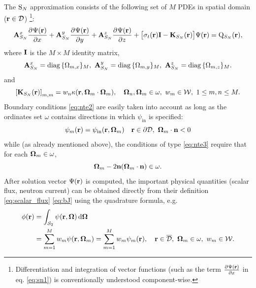 The $\text{S}_{N}$ approximation consists of the
following set of $M$ PDEs in spatial domain ($\mathbf{r}\in\mathcal{D}$) \footnote{Differentiation and integration of vector functions
(such as the term $\frac{\partial^{}\Psi(\mathbf{r})}{\partial x^{}}$ in eq. \eqref{eq:sn1}) is conventionally understood component-wise.}:
\begin{equation}\label{eq:sn1} 
\mathbf{A}_{S_N}^x\frac{\partial^{}\Psi(\mathbf{r})}{\partial x^{}} + \mathbf{A}_{S_N}^y\frac{\partial^{}\Psi(\mathbf{r})}{\partial y^{}} +
\mathbf{A}_{S_N}^z\frac{\partial^{}\Psi(\mathbf{r})}{\partial z^{}} + \bigl[\sigma_t(\mathbf{r})\mathbf{I} - \mathbf{K}_{S_N}(\mathbf{r})\bigr]\Psi(\mathbf{r}) = \mathrm{Q}_{S_N}(\mathbf{r}),
\end{equation}
where $\mathbf{I}$ is the $M\times M$ identity matrix,
$$
	\mathbf{A}_{S_N}^x = \operatorname{diag\,}\{\Omega_{m,x}\}_{M},\ \mathbf{A}_{S_N}^y = \operatorname{diag\,}\{\Omega_{m,y}\}_{M},\
	\mathbf{A}_{S_N}^z = \operatorname{diag\,}\{\Omega_{m,z}\}_{M}.
$$
and
\begin{equation}\label{eq:SNK}
	\left[\mathbf{K}_{S_N}(\mathbf{r})\right]_{m,m} = w_n \kappa(\mathbf{r},\mathbf{\Omega}_m\cdot\mathbf{\Omega}_m),\quad
	\mathbf{\Omega}_n,\mathbf{\Omega}_m\in \omega,\ w_m\in \mathcal{W},\ 1 \leq m,n \leq M.
\end{equation}
Boundary conditions \eqref{eq:nte2} are easily taken into account as long as the ordinates set $\omega$ contains
directions in which $\psi_{\text{in}}$ is specified:
\begin{equation}\label{eq:bc_sn}
	\psi_m(\br) = \psi_{\text{in}}(\br, \bomega_m)\quad \br\in\pV, \ \bomega_m\cdot\bn < 0
\end{equation}	
while (as already mentioned above), the conditions of type
\eqref{eq:nte3} require that for each $\mathbf{\Omega}_m\in\omega$, 
$$
	\mathbf{\Omega}_m - 2 \mathbf{n} (\mathbf{\Omega}_m \cdot \mathbf{n}) \in \omega.
$$ 
After solution vector $\Psi(\mathbf{r})$ is computed, the
important physical quantities (scalar flux, neutron current) can be obtained directly from their definition \eqref{eq:scalar_flux}
\eqref{eq:bJ} using the quadrature formula, e.g.
\begin{equation}\label{eq:scalar_flux_sn}
\begin{aligned}
	\phi(\mathbf{r}) &= \int_{\mathcal{S}_2}\psi(\mathbf{r},\mathbf{\Omega})\,\text{d}\mathbf{\Omega}\,\\
	 &= \sum_{m=1}^{M} w_m \psi(\mathbf{r},\mathbf{\Omega}_m) = \sum_{m=1}^{M} w_m \psi_m(\mathbf{r}), \quad
	\mathbf{r}\in \overline{\mathcal{D}},\ \mathbf{\Omega}_m\in \omega,\ w_m\in \mathcal{W}.
\end{aligned}
\end{equation}

